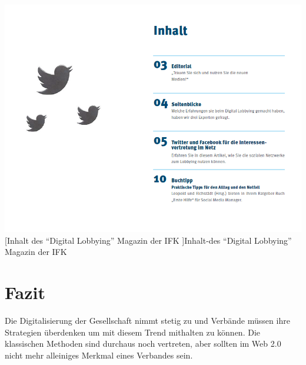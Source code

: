 \documentclass[12pt,a4paper,bibliography=totocnumbered,listof=totocnumbered]{scrartcl}
\begin{document}
\vspace{1em}
\begin{minipage}{\linewidth}
	\centering
	\includegraphics[width=1\linewidth]{Bilder/bla3.png}
	[Inhalt des "`Digital Lobbying"' Magazin der IFK ]{Inhalt-des "`Digital Lobbying"' Magazin der IFK\footnotemark }
	\label{fig:osgi}
\end{minipage}

\pagebreak

\section{Fazit}

Die Digitalisierung der Gesellschaft nimmt stetig zu und Verbände müssen ihre Strategien überdenken um mit diesem Trend mithalten zu können. Die klassischen Methoden sind durchaus noch vertreten, aber sollten im Web 2.0 nicht mehr alleiniges Merkmal eines Verbandes sein. 

\pagebreak

\renewcommand\refname{Quellenverzeichnis}
\nocite{*}


\pagebreak
\end{document}
